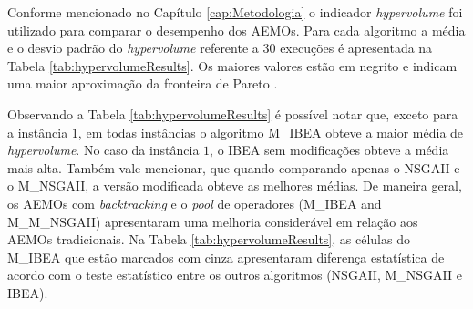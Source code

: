 Conforme mencionado no Capítulo \ref{cap:Metodologia} o indicador \textit{hypervolume} foi utilizado para comparar o desempenho dos AEMOs. Para cada algoritmo a média e o desvio padrão do \textit{hypervolume}  referente a 30 execuções é apresentada na Tabela \ref{tab:hypervolumeResults}. Os maiores valores estão em negrito e indicam uma maior aproximação da fronteira de Pareto \cite{barr1998economics}.

Observando a Tabela \ref{tab:hypervolumeResults} é possível notar que, exceto para a instância $1$, em todas instâncias o algoritmo M\_IBEA  obteve a maior média de \textit{hypervolume}. No caso da instância $1$, o IBEA sem modificações obteve a média mais alta. Também vale mencionar, que quando comparando apenas o NSGAII e o M\_NSGAII, a versão modificada obteve as melhores médias. De maneira geral, os AEMOs com \textit{backtracking} e o \textit{pool} de operadores (M\_IBEA and M\_M_NSGAII) apresentaram uma melhoria considerável em relação aos AEMOs tradicionais. Na Tabela \ref{tab:hypervolumeResults}, as células do M\_IBEA que estão marcados com cinza apresentaram diferença estatística de acordo com o teste estatístico \cite{mckight2010kruskal} entre os outros algoritmos (NSGAII, M\_NSGAII e IBEA).





